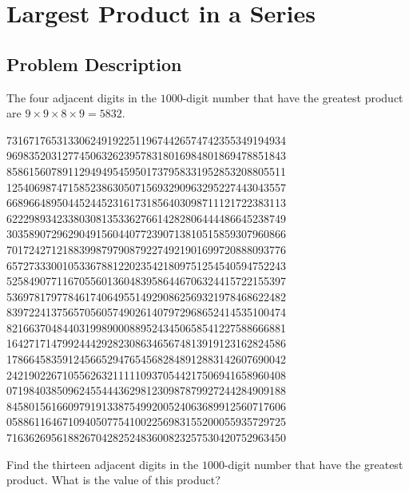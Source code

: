\chapter{Largest Product in a Series}
\section{Problem Description}
\begin{tcolorbox}
	The four adjacent digits in the $1000$-digit number that have the greatest product are $9 \times 9 \times 8 \times 9
	= 5832$.

	73167176531330624919225119674426574742355349194934
	96983520312774506326239578318016984801869478851843
	85861560789112949495459501737958331952853208805511
	12540698747158523863050715693290963295227443043557
	66896648950445244523161731856403098711121722383113
	62229893423380308135336276614282806444486645238749
	30358907296290491560440772390713810515859307960866
	70172427121883998797908792274921901699720888093776
	65727333001053367881220235421809751254540594752243
	52584907711670556013604839586446706324415722155397
	53697817977846174064955149290862569321978468622482
	83972241375657056057490261407972968652414535100474
	82166370484403199890008895243450658541227588666881
	16427171479924442928230863465674813919123162824586
	17866458359124566529476545682848912883142607690042
	24219022671055626321111109370544217506941658960408
	07198403850962455444362981230987879927244284909188
	84580156166097919133875499200524063689912560717606
	05886116467109405077541002256983155200055935729725
	71636269561882670428252483600823257530420752963450

	Find the thirteen adjacent digits in the $1000$-digit number that have the greatest product. What is the value of
	this product?
\end{tcolorbox}
